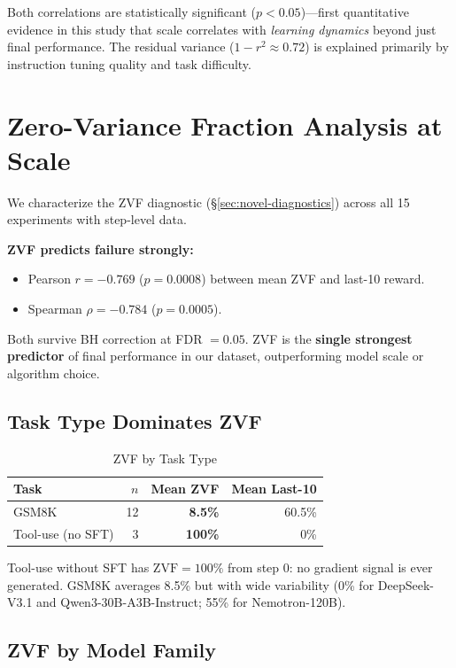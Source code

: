 \documentclass[12pt,a4paper]{report}
\theoremstyle{definition}
\begin{document}
Both correlations are statistically significant ($p < 0.05$)---first quantitative evidence in this study
that scale correlates with \emph{learning dynamics} beyond just final performance. The residual variance
($1 - r^2 \approx 0.72$) is explained primarily by instruction tuning quality and task difficulty.

\section{Zero-Variance Fraction Analysis at Scale}
\label{sec:zvf-scale}

We characterize the ZVF diagnostic (\S\ref{sec:novel-diagnostics}) across all 15 experiments with
step-level data.

\textbf{ZVF predicts failure strongly:}
\begin{itemize}[nosep]
\item Pearson $r = -0.769$ ($p = 0.0008$) between mean ZVF and last-10 reward.
\item Spearman $\rho = -0.784$ ($p = 0.0005$).
\end{itemize}
Both survive BH correction at FDR $= 0.05$. ZVF is the \textbf{single strongest predictor} of final
performance in our dataset, outperforming model scale or algorithm choice.

\subsection{Task Type Dominates ZVF}

\begin{table}[htbp]
\centering
\caption{ZVF by Task Type}
\label{tab:zvf-task}
\begin{tabular}{lrrr}
\toprule
\textbf{Task} & \textbf{$n$} & \textbf{Mean ZVF} & \textbf{Mean Last-10} \\
\midrule
GSM8K     & 12 & \textbf{8.5\%}  & 60.5\% \\
Tool-use (no SFT) & 3 & \textbf{100\%} & 0\% \\
\bottomrule
\end{tabular}
\end{table}

Tool-use without SFT has $\text{ZVF} = 100\%$ from step 0: no gradient signal is ever generated. GSM8K
averages 8.5\% but with wide variability (0\% for DeepSeek-V3.1 and Qwen3-30B-A3B-Instruct; 55\% for
Nemotron-120B).

\subsection{ZVF by Model Family}
\end{document}
